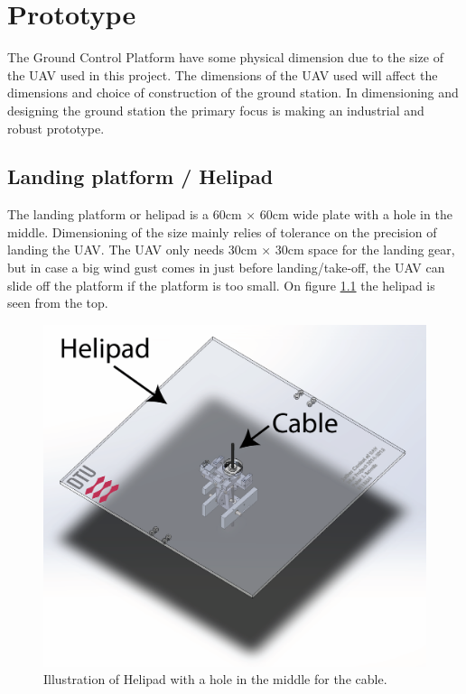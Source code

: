 
\chapter{Prototype}
The Ground Control Platform have some physical dimension due to the size of the UAV used in this project. The dimensions of the UAV used will affect the dimensions and choice of construction of the ground station. In dimensioning and designing the ground station the primary focus is making an industrial and robust prototype. 



\section{Landing platform / Helipad}
The landing platform or helipad is a 60cm $\times$ 60cm wide plate with a hole in the middle. Dimensioning of the size mainly relies of tolerance on the precision of landing the UAV. The UAV only needs 30cm $\times$ 30cm space for the landing gear, but in case a big wind gust comes in just before landing/take-off, the UAV can slide off the platform if the platform is too small. On figure \ref{fig:helipad} the helipad is seen from the top.

\begin{figure}[hbtp]
\centering
\includegraphics[scale=0.6]{graphics/cad/toplevel.png}
\caption{Illustration of Helipad with a hole in the middle for the cable.}
\label{fig:helipad}
\end{figure}

